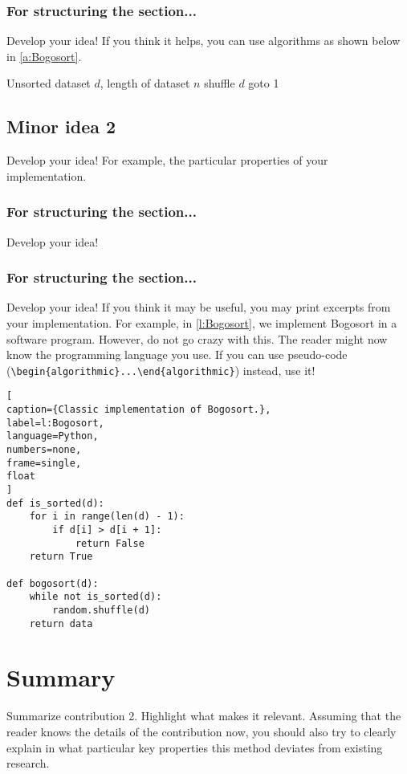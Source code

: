 \subsubsection{For structuring the section...}
Develop your idea! If you think it helps, you can use algorithms as shown below in \autoref{a:Bogosort}.

\begin{algorithm}[t]
  \caption{How Bogosort works.}
  \label{a:Bogosort}
  \begin{algorithmic}[1]
    \REQUIRE Unsorted dataset $d$, length of dataset $n$
    \STATE shuffle $d$
        \STATE goto 1
      \ENDIF
    \ENDFOR
  \end{algorithmic}
\end{algorithm}



\subsection{Minor idea 2}
\label{s:Contribution-2-Major-2-Minor-2}
Develop your idea! For example, the particular properties of your implementation.

\subsubsection{For structuring the section...}
Develop your idea!

\subsubsection{For structuring the section...}
Develop your idea! If you think it may be useful, you may print excerpts from your implementation. For example, in \autoref{l:Bogosort}, we implement Bogosort in a software program. However, do not go crazy with this. The reader might now know the programming language you use. If you can use pseudo-code (\ie \texttt{\textbackslash{}begin\{algorithmic\}...\textbackslash{}end\{algorithmic\}}) instead, use it!

\begin{lstlisting}[
caption={Classic implementation of Bogosort.},
label=l:Bogosort,
language=Python,
numbers=none,
frame=single,
float
]
def is_sorted(d):
    for i in range(len(d) - 1):
        if d[i] > d[i + 1]:
            return False
    return True

def bogosort(d):
    while not is_sorted(d):
        random.shuffle(d)
    return data
\end{lstlisting}


\section{Summary}
\label{s:Contribution-2-Summary}

Summarize contribution 2. Highlight what makes it relevant. Assuming that the reader knows the details of the contribution now, you should also try to clearly explain in what particular key properties this method deviates from existing research.
